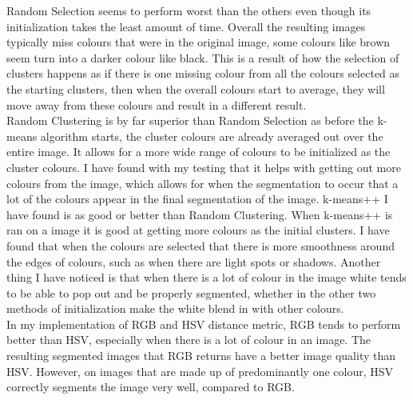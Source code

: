 \documentclass{article}
\begin{document}
Random Selection seems to perform worst than the others even though its
initialization takes the least amount of time. Overall the resulting images
typically miss colours that were in the original image, some colours like brown
seem turn into a darker colour like black. This is a result of how the selection
of clusters happens as if there is one missing colour from all the colours
selected as the starting clusters, then when the overall colours start to
average, they will move away from these colours and result in a different
result.\\
  
Random Clustering is by far superior than Random Selection as before
the k-means algorithm starts, the cluster colours are already averaged out over
the entire image. It allows for a more wide range of colours to be initialized
as the cluster colours. I have found with my testing that it helps with getting
out more colours from the image, which allows for when the segmentation to occur
that a lot of the colours appear in the final segmentation of the image.
k-means++ I have found is as good or better than Random Clustering. When
k-means++ is ran on a image it is good at getting more colours as the initial
clusters. I have found that when the colours are selected that there is more
smoothness around the edges of colours, such as when there are light spots or
shadows. Another thing I have noticed is that when there is a lot of colour in
the image white tends to be able to pop out and be properly segmented, whether
in the other two methods of initialization make the white blend in with other
colours.\\

In my implementation of RGB and HSV distance metric, RGB tends to perform better
than HSV, especially when there is a lot of colour in an image. The resulting
segmented images that RGB returns have a better image quality than HSV. However,
on images that are made up of predominantly one colour, HSV correctly segments
the image very well, compared to RGB.

\end{document}
